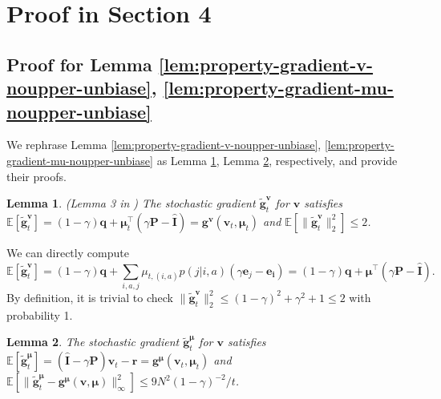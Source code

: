 \documentclass[12pt]{article}
\newtheorem{lemma}{Lemma}
\begin{document}
\section{Proof in Section 4}

\subsection{Proof for Lemma \ref{lem:property-gradient-v-noupper-unbiase}, \ref{lem:property-gradient-mu-noupper-unbiase}}

\label{sec:app-pf-gradient-vmu-noupper}

We rephrase Lemma \ref{lem:property-gradient-v-noupper-unbiase}, \ref{lem:property-gradient-mu-noupper-unbiase} as Lemma \ref{lem:property-gradient-v-noupper}, Lemma \ref{lem:property-gradient-mu-noupper}, respectively, and provide their proofs.

\begin{lemma}{(Lemma 3 in \cite{jin2020efficiently})}
    The stochastic gradient $\tilde{\boldsymbol{g}}_t^{\boldsymbol{v}}$ for $\boldsymbol{v}$ satisfies $\mathbb{E}[\tilde{\boldsymbol{g}}_t^{\boldsymbol{v}}] = (1-\gamma) \boldsymbol{q} + \boldsymbol{\mu}_t^{\top} (\gamma \boldsymbol{\text{P}} - \hat{\boldsymbol{\text{I}}}) = \boldsymbol{g}^{\boldsymbol{v}}(\boldsymbol{v}_t,\boldsymbol{\mu}_t)$ and $\mathbb{E}[\|\tilde{\boldsymbol{g}}_t^{\boldsymbol{v}}\|_2^2] \le 2$.
    \label{lem:property-gradient-v-noupper}
\end{lemma}

    We can directly compute
    \begin{equation*}
        \mathbb{E}[\tilde{\boldsymbol{g}}_t^{\boldsymbol{v}}] = (1 -\gamma) \boldsymbol{q} + \sum_{i,a,j} \mu_{t,(i,a)} p(j|i,a)(\gamma \boldsymbol{e}_j - \boldsymbol{e_i}) = (1-\gamma) \boldsymbol{q} + \boldsymbol{\mu}^{\top} (\gamma \boldsymbol{\text{P}} - \hat{\boldsymbol{\text{I}}}).
    \end{equation*}
    By definition, it is trivial to check $\|\tilde{\boldsymbol{g}}_t^{\boldsymbol{v}}\|_2^2 \le (1-\gamma)^2 + \gamma^2 + 1 \le 2$ with probability 1.
\endproof

\begin{lemma}
    The stochastic gradient $\tilde{\boldsymbol{g}}_t^{\boldsymbol{\mu}}$ for $\boldsymbol{v}$ satisfies $\mathbb{E}[\tilde{\boldsymbol{g}}_t^{\boldsymbol{\mu}}] = (\hat{\boldsymbol{\text{I}}} - \gamma \boldsymbol{\text{P}}) \boldsymbol{v}_t - \boldsymbol{\text{r}} = \boldsymbol{g}^{\boldsymbol{\mu}}(\boldsymbol{v}_t,\boldsymbol{\mu}_t)$ and $\mathbb{E}[\|\tilde{\boldsymbol{g}}_t^{\boldsymbol{\mu}}-\boldsymbol{g}^{\boldsymbol{\mu}}(\boldsymbol{v},\boldsymbol{\mu})\|_{\infty}^2] \le 9N^2(1-\gamma)^{-2}/t$.
    \label{lem:property-gradient-mu-noupper}
\end{lemma}
\end{document}
